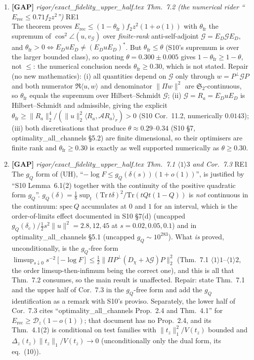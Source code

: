 \documentclass[11pt]{article}
\begin{document}
\begin{enumerate}[leftmargin=1.6em,itemsep=6pt]
\item \textbf{[GAP]} \emph{rigor/exact\_fidelity\_upper\_half.tex Thm.~7.2 (the numerical rider ``\(E_{\mathrm{rec}}\le0.71f_2z^2\)'')} \hfill\textsc{RE1}\\ The theorem proves \(E_{\mathrm{rec}}\le(1-\theta_{\mathrm{fr}})f_2z^2(1+o(1))\) with \(\theta_{\mathrm{fr}}\) the supremum of \(\cos^2\angle(u,v_{\mathcal G})\) over \emph{finite-rank} anti-self-adjoint \(\mathcal G=E_D\mathcal GE_D\), and \(\theta_{\mathrm{fr}}>0\iff E_DuE_D\ne(E_DuE_D)^{*}\). But \(\theta_{\mathrm{fr}}\le\theta\) (S10's supremum is over the larger bounded class), so quoting \(\theta=0.300\pm0.005\) gives \(1-\theta_{\mathrm{fr}}\ge1-\theta\), not \(\le\): the numerical conclusion needs \(\theta_{\mathrm{fr}}\ge0.30\), which is not stated. Repair (no new mathematics): (i) all quantities depend on \(\mathcal G\) only through \(w=P^{\perp}\mathcal GP\) and both numerator \(\Re\langle u,w\rangle\) and denominator \(\lVert\Pi w\rVert^2\) are \(\mathfrak S_2\)-continuous, so \(\theta_{\mathrm{fr}}\) equals the supremum over Hilbert--Schmidt \(\mathcal G\); (ii) \(\mathcal G=R_a=E_DuE_D\) is Hilbert--Schmidt and admissible, giving the explicit \(\theta_{\mathrm{fr}}\ge\lVert R_a\rVert_2^4/(\lVert u\rVert_2^2\langle R_a,\mathcal AR_a\rangle_r)>0\) (S10 Cor.~11.2, numerically \(0.0143\)); (iii) both discretisations that produce \(\theta\approx0.29\)--\(0.34\) (S10 \S7, optimality\_all\_channels \S5.2) are finite dimensional, so their optimisers are finite rank and \(\theta_{\mathrm{fr}}\ge0.30\) is exactly as well supported numerically as \(\theta\ge0.30\).
\item \textbf{[GAP]} \emph{rigor/exact\_fidelity\_upper\_half.tex Thm.~7.1 \(\langle1\rangle3\) and Cor.~7.3} \hfill\textsc{RE1}\\ The \(g_Q\) form of (UH), ``\(-\log F\le g_Q(\delta(s))(1+o(1))\)'', is justified by ``S10 Lemma~6.1(2) together with the continuity of the positive quadratic form \(g_Q\)''. \(g_Q(\delta)=\frac18\sup_t(\mathrm{Tr}\,t\delta)^2/\mathrm{Tr}(tQt(1-Q))\) is \emph{not} continuous in the continuum: \(\mathrm{spec}\,Q\) accumulates at \(0\) and \(1\) for an interval, which is the order-of-limits effect documented in S10 \S7(d) (uncapped \(g_Q(\delta_c)/\frac12s^2\lVert u\rVert^2=2.8,12,45\) at \(s=0.02,0.05,0.1\)) and in optimality\_all\_channels \S5.1 (uncapped \(g_Q\sim10^{283}\)). What \emph{is} proved, unconditionally, is the \(g_Q\)-free form \(\limsup_{s\downarrow0}s^{-2}[-\log F]\le\frac12\lVert\Pi P^{\perp}(D_\chi+\lambda\mathcal G)P\rVert_2^2\) (Thm.~7.1 \(\langle1\rangle1\)--\(\langle1\rangle2\), the order limsup-then-infimum being the correct one), and this is all that Thm.~7.2 consumes, so the main result is unaffected. Repair: state Thm.~7.1 and the upper half of Cor.~7.3 in the \(g_Q\)-free form and add the \(g_Q\) identification as a remark with S10's proviso. Separately, the lower half of Cor.~7.3 cites ``optimality\_all\_channels Prop.~2.4 and Thm.~4.1'' for \(E_{\mathrm{rec}}\ge\mathcal D_z(1-o(1))\); that document has no Prop.~2.4, and its Thm.~4.1(2) is conditional on test families with \(\lVert t_z\rVert_1^2/V(t_z)\) bounded and \(\Delta_z(t_z)\lVert t_z\rVert_1/V(t_z)\to0\) (unconditionally only the dual form, its eq.~(10)).

\end{enumerate}
\end{document}
